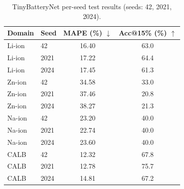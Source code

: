 \begin{table}[t]
\centering
\caption{TinyBatteryNet per-seed test results (seeds: 42, 2021, 2024).}
\label{tab:multiseed_detail}
\begin{tabular*}{\tblwidth}{@{}LLCC@{}}
\toprule
Domain & Seed & MAPE (\%) $\downarrow$ & Acc@15\% (\%) $\uparrow$ \\
\midrule
Li-ion & 42 & 16.40 & 63.0 \\
Li-ion & 2021 & 17.22 & 64.4 \\
Li-ion & 2024 & 17.45 & 61.3 \\
\midrule
Zn-ion & 42 & 34.58 & 33.0 \\
Zn-ion & 2021 & 37.46 & 20.8 \\
Zn-ion & 2024 & 38.27 & 21.3 \\
\midrule
Na-ion & 42 & 23.20 & 40.0 \\
Na-ion & 2021 & 22.74 & 40.0 \\
Na-ion & 2024 & 23.60 & 40.0 \\
\midrule
CALB & 42 & 12.32 & 67.8 \\
CALB & 2021 & 12.78 & 75.7 \\
CALB & 2024 & 14.81 & 67.2 \\
\bottomrule
\end{tabular*}
\end{table}
